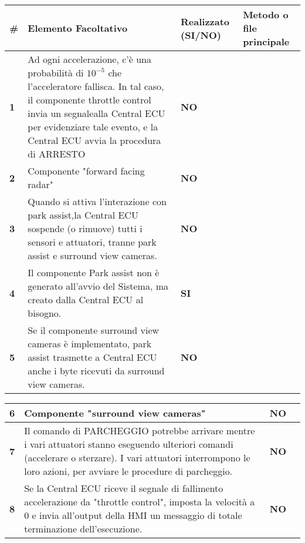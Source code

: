 \documentclass[12pt]{article}
\begin{document}
\begin{tabular}{|p{}|p{}|p{}|p{}|}
    \hline
    \textbf{\#} & \textbf{Elemento Facoltativo} & \textbf{Realizzato (SI/NO)} & \textbf{Metodo o file principale}\\
    \hline
    \textbf{1} &
    Ad ogni accelerazione, c'\`{e} una probabilit\`{a} di $10^{-5}$ che l'acceleratore 
    fallisca. In tal caso, il componente throttle control invia un segnalealla 
    Central ECU per evidenziare tale evento, e la Central ECU avvia la procedura 
    di ARRESTO & \textbf{NO} &  \\
    \hline
    \textbf{2} & Componente "forward facing radar" & \textbf{NO} & \\
    \hline
    \textbf{3} &
    Quando si attiva l'interazione con park assist,la Central ECU sospende (o 
    rimuove) tutti i sensori e attuatori, tranne park assist e surround view 
    cameras. & \textbf{NO} & \\
    \hline
    \textbf{4} &
    Il componente Park assist non \`{e} generato all'avvio del Sistema, ma creato 
    dalla Central ECU al bisogno. & \textbf{SI} &  \\
    \hline
    \textbf{5} &
    Se il componente surround view cameras \`{e} implementato, park assist 
    trasmette a Central ECU anche i byte ricevuti da surround view cameras. &
    \textbf{NO} & \\
    \hline
\end{tabular}

\begin{flushleft}
    \begin{tabular}{|p{}|p{}|p{}|p{}|}
        \hline
        \textbf{6} & Componente "surround view cameras" & \textbf{NO} & \\
        \hline
        \textbf{7} &
        Il comando di PARCHEGGIO potrebbe arrivare mentre i vari attuatori stanno 
        eseguendo ulteriori comandi (accelerare o sterzare). I vari attuatori 
        interrompono le loro azioni, per avviare le procedure di parcheggio. &
        \textbf{NO} & \\
        \hline
        \textbf{8} &
        Se la Central ECU riceve il segnale di fallimento accelerazione da "throttle 
        control", imposta la velocit\`{a} a 0 e invia all'output della HMI un 
        messaggio di totale terminazione dell'esecuzione. & \textbf{NO} & \\
        \hline
    \end{tabular}    
\end{flushleft}
\end{document}
